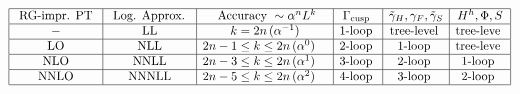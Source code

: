 \documentclass[a4paper,11pt]{article}
\begin{document}
\begin{table}[htbp]
\begin{equation}
\begin{array}{|c|c|c|c|c|c|}
\hline \text { RG-impr. PT } & \text { Log. Approx. } & \text { Accuracy } \sim \alpha^n L^k & \Gamma_{\text {cusp }} & \tilde \gamma_H, \gamma_F, \tilde \gamma_S & {H}^{h}, \Phi, {S} \\
\hline- & \mathrm{LL} & k = 2 n \, (\alpha^{-1}) & \text {1-loop } & \text {tree-level } & \text {tree-leve } \\
\hline \mathrm{LO} & \text { NLL } & 2n-1 \leq k \leq 2 n \, (\alpha^{0}) \quad & \text {2-loop } & \text {1-loop } & \text {tree-leve } \\
\hline \mathrm{NLO} & \text { NNLL } & 2n-3 \leq k \leq 2 n \, (\alpha^{1}) \quad &  \text {3-loop } & \text {2-loop } & \text {1-loop } \\
\hline \text { NNLO } & \text { NNNLL } & 2n-5 \leq k \leq 2 n \, (\alpha^{2}) \quad & \text {4-loop } &  \text {3-loop } & \text {2-loop } \\
\hline
\end{array} \nonumber
\end{equation}
\caption{Different approximation schemes for the matching kernel ${\cal C}^{h}_{\rm sg}$ in the threshold limit.}
\label{appschS}
\end{table}
\end{document}
